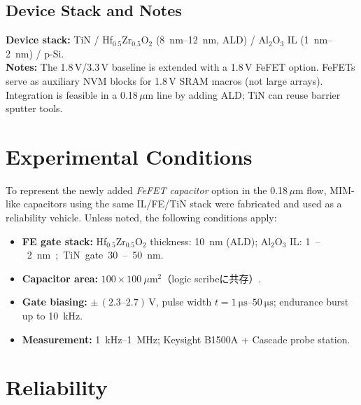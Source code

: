 \documentclass[journal]{IEEEtran}
\begin{document}
\subsection*{Device Stack and Notes}
\textbf{Device stack:} TiN / Hf$_{0.5}$Zr$_{0.5}$O$_2$ (\SI{8}{\nano\meter}–\SI{12}{\nano\meter}, ALD) / Al$_2$O$_3$ IL (\SI{1}{\nano\meter}–\SI{2}{\nano\meter}) / p-Si. \\
\textbf{Notes:} The 1.8\,V/3.3\,V baseline is extended with a 1.8\,V FeFET option. FeFETs serve as auxiliary NVM blocks for 1.8\,V SRAM macros (not large arrays). Integration is feasible in a 0.18\,$\mu$m line by adding ALD; TiN can reuse barrier sputter tools.

\section{Experimental Conditions}
To represent the newly added \emph{FeFET capacitor} option in the 0.18\,$\mu$m flow, MIM-like capacitors using the same IL/FE/TiN stack were fabricated and used as a reliability vehicle. Unless noted, the following conditions apply:
\begin{itemize}
\item \textbf{FE gate stack:} Hf$_{0.5}$Zr$_{0.5}$O$_2$ thickness: \SI{10}{\nano\meter} (ALD); Al$_2$O$_3$ IL: \SI{1}–\SI{2}{\nano\meter}; TiN gate \SI{30}–\SI{50}{\nano\meter}.
\item \textbf{Capacitor area:} $100\times100~\mu$m$^2$（logic scribeに共存）.
\item \textbf{Gate biasing:} $\pm\,(2.3\text{–}2.7)$\,V, pulse width $t=\SI{1}{\micro\second}\text{–}\SI{50}{\micro\second}$; endurance burst up to \SI{10}{\kilo\hertz}.
\item \textbf{Measurement:} \SI{1}{\kilo\hertz}–\SI{1}{\mega\hertz}; Keysight B1500A + Cascade probe station.
\end{itemize}

\section{Reliability}
\end{document}

